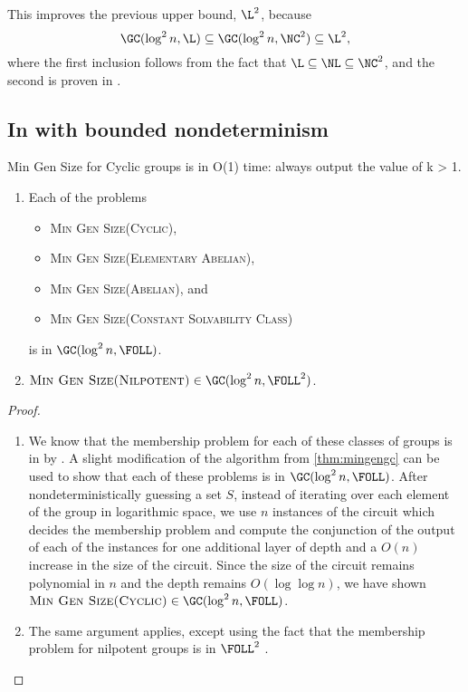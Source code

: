 \documentclass{article}
\begin{document}
This improves the previous upper bound, $\L^2$, because
\begin{equation*}
  \GC(\log^2 n, \L) \subseteq \GC(\log^2 n, \NC^2) \subseteq \L^2,
\end{equation*}
where the first inclusion follows from the fact that $\L \subseteq \NL \subseteq \NC^2$, and the second is proven in \cite[Lemma~3.2.8]{wolf90}.

\subsection{In \texorpdfstring{\FOLL}{FOLL} with bounded nondeterminism}

\begin{todo}
  Min Gen Size for Cyclic groups is in O(1) time: always output the value of k > 1.
\end{todo}
\begin{theorem}
  \mbox{}
  \begin{enumerate}
  \item Each of the problems
    \begin{itemize}
    \item \textsc{Min Gen Size(Cyclic)},
    \item \textsc{Min Gen Size(Elementary Abelian)},
    \item \textsc{Min Gen Size(Abelian)}, and
    \item \textsc{Min Gen Size(Constant Solvability Class)}
    \end{itemize}
    is in $\GC(\log^2 n, \FOLL)$.
  \item $\textsc{Min Gen Size(Nilpotent)} \in \GC(\log^2 n, \FOLL^2)$.
  \end{enumerate}
\end{theorem}
\begin{proof}
  \mbox{}
  \begin{enumerate}
  \item
    We know that the membership problem for each of these classes of groups is in \FOLL{} by \cite[Section~3]{bklm01}.
    A slight modification of the algorithm from \autoref{thm:mingengc} can be used to show that each of these problems is in $\GC(\log^2 n, \FOLL)$.
    After nondeterministically guessing a set $S$, instead of iterating over each element of the group in logarithmic space, we use $n$ instances of the \FOLL{} circuit which decides the membership problem and compute the conjunction of the output of each of the instances for one additional layer of depth and a $O(n)$ increase in the size of the circuit.
    Since the size of the circuit remains polynomial in $n$ and the depth remains $O(\log \log n)$, we have shown $\textsc{Min Gen Size(Cyclic)} \in \GC(\log^2 n, \FOLL)$.
  \item The same argument applies, except using the fact that the membership problem for nilpotent groups is in $\FOLL^2$ \cite[Corollary~3.12]{bklm01}. \qedhere
  \end{enumerate}
\end{proof}
\end{document}
